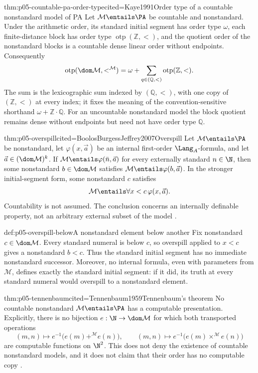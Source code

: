 \begin{hbtheorem}{thm:p05-countable-pa-order-type}{cited=Kaye1991}{Order type of a countable nonstandard model of PA}
Let \(\mathcal M\entails\PA\) be countable and nonstandard.  Under the
arithmetic order, its standard initial segment has order type \(\omega\),
each finite-distance block has order type
\(\operatorname{otp}(\mathbb Z,<)\), and the quotient order of the nonstandard
blocks is a countable dense linear order without endpoints.  Consequently
\[
  \operatorname{otp}(\dom\mathcal M,<^{\mathcal M})
  =\omega+\sum_{q\in(\mathbb Q,<)}\operatorname{otp}(\mathbb Z,<).
\]
The sum is the lexicographic sum indexed by \((\mathbb Q,<)\), with one copy of
\((\mathbb Z,<)\) at every index; it fixes the meaning of the
convention-sensitive shorthand \(\omega+\mathbb Z\cdot\mathbb Q\).  For an
uncountable nonstandard model the
block quotient remains dense without endpoints but need not have order
type \(\mathbb Q\).
\end{hbtheorem}

\begin{hbtheorem}{thm:p05-overspill}{cited=BoolosBurgessJeffrey2007}{Overspill}
Let \(\mathcal M\entails\PA\) be nonstandard, let
\(\varphi(x,\vec a)\) be an internal first-order \(\Lang_A\)-formula,
and let \(\vec a\in(\dom\mathcal M)^k\).  If
\(\mathcal M\entails\varphi(\bar n,\vec a)\) for every externally
standard \(n\in\N\), then some nonstandard \(b\in\dom\mathcal M\)
satisfies \(\mathcal M\entails\varphi(b,\vec a)\).  In the stronger
initial-segment form, some nonstandard \(c\) satisfies
\[
  \mathcal M\entails\forall x<c\,\varphi(x,\vec a).
\]
Countability is not assumed.  The conclusion concerns an internally
definable property, not an arbitrary external subset of the model
\cite{Kaye1991}.
\end{hbtheorem}

\begin{hbexample}{def:p05-overspill-below}{A nonstandard element below another}
Fix nonstandard \(c\in\dom\mathcal M\).  Every standard numeral is below
\(c\), so overspill applied to \(x<c\) gives a nonstandard \(b<c\).
Thus the standard initial segment has no immediate nonstandard successor.
Moreover, no internal formula, even with parameters from \(\mathcal M\),
defines exactly the standard initial segment: if it did, its truth at every
standard numeral would overspill to a nonstandard element.
\end{hbexample}

\begin{hbtheorem}{thm:p05-tennenbaum}{cited=Tennenbaum1959}{Tennenbaum's theorem}
No countable nonstandard \(\mathcal M\entails\PA\) has a computable
presentation.  Explicitly, there is no bijection
\(e:\N\to\dom\mathcal M\) for which both transported operations
\[
  (m,n)\longmapsto e^{-1}\!\bigl(e(m)+^{\mathcal M}e(n)\bigr),\qquad
  (m,n)\longmapsto e^{-1}\!\bigl(e(m)\times^{\mathcal M}e(n)\bigr)
\]
are computable functions on \(\N^2\).  This does not deny the existence
of countable nonstandard models, and it does not claim that their order
has no computable copy \cite{Kaye1991}.
\end{hbtheorem}

